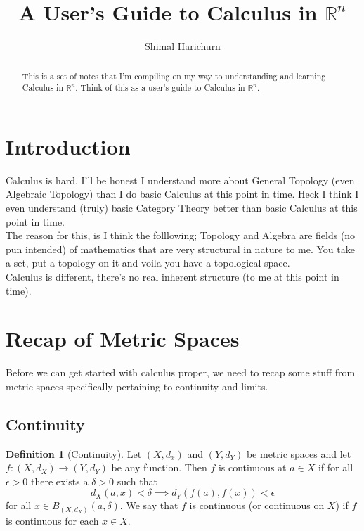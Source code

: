 \documentclass[12pt]{article}
\title{A User's Guide to Calculus in $\mathbb{R}^n$}
\author{Shimal Harichurn}
\theoremstyle{definition}
\newtheorem{definition}{Definition}[section]
\numberwithin{definition}{subsection}
\numberwithin{theorem}{subsection}
\numberwithin{corollary}{subsection}
\numberwithin{example}{subsection}
\theoremstyle{remark}
\theoremstyle{point}
\begin{document}
	\maketitle
	\begin{abstract}
		\begin{center}
			This is a set of notes that I'm compiling on my way to understanding and learning Calculus in $\mathbb{R}^n$. Think of this as a user's guide to Calculus in $\mathbb{R}^n$.
		\end{center}
	\end{abstract}
	
	\section{Introduction}
		
	Calculus is hard. I'll be honest I understand more about General Topology (even Algebraic Topology) than I do basic Calculus at this point in time. Heck I think I even understand (truly) basic Category Theory better than basic Calculus at this point in time. \\
		
	The reason for this, is I think the folllowing; Topology and Algebra are fields (no pun intended) of mathematics that are very structural in nature to me. You take a set, put a topology on it and voila you have a topological space. \\
			
	Calculus is different, there's no real inherent structure (to me at this point in time).
	
	\newpage
	
	\tableofcontents
	
	\newpage
	
	\section{Recap of Metric Spaces}
	Before we can get started with calculus proper, we need to recap some stuff from metric spaces specifically pertaining to continuity and limits. 
	
	\subsection{Continuity}  
	
	
	\begin{definition}[Continuity]
		Let $(X, d_x)$ and $(Y, d_Y)$ be metric spaces and let $f : (X, d_X) \to (Y, d_Y)$ be any function. Then $f$ is continuous at $a \in X$ if for all  $\epsilon > 0$ there exists a $\delta > 0$ such that $$d_X(a, x) < \delta \implies d_Y\left(f(a), f(x) \right) < \epsilon$$ for all $x \in B_{(X, d_X)}(a, \delta)$.  We say that $f$ is continuous (or continuous on $X$) if $f$ is continuous for each $x \in X$.
	\end{definition}
	
\end{document}
